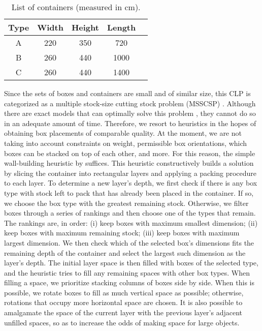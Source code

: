 \documentclass{pssbmac}
\begin{document}
\begin{table}[H]
    \caption{ {\small List of containers (measured in cm).}}
    \centering
    \begin{tabular}{ccccc}
    \hline
    Type & Width & Height & Length\\ \hline
    A  & 220 & 350 & 720\\
    B  & 260 & 440 & 1000\\
    C  & 260 & 440 & 1400\\
    \hline
    \end{tabular}\label{List containers}
\end{table}

Since the sets of boxes and containers are small and of similar size, this CLP is categorized as a multiple stock-size cutting stock problem (MSSCSP) \cite{Bortfeldt2013}. Although there are exact models that can optimally solve this problem \cite{Chen1995}, they cannot do so in an adequate amount of time. Therefore, we resort to heuristics in the hopes of obtaining box placements of comparable quality. At the moment, we are not taking into account constraints on weight, permissible box orientations, which boxes can be stacked on top of each other, and more. For this reason, the simple wall-building heuristic by \textcite{George1980} suffices. This heuristic constructively builds a solution by slicing the container into rectangular layers and applying a packing procedure to each layer. To determine a new layer's depth, we first check if there is any box type with stock left to pack that has already been placed in the container. If so, we choose the box type with the greatest remaining stock. Otherwise, we filter boxes through a series of rankings and then choose one of the types that remain. The rankings are, in order: (i) keep boxes with maximum smallest dimension; (ii) keep boxes with maximum remaining stock; (iii) keep boxes with maximum largest dimension. We then check which of the selected box's dimensions fits the remaining depth of the container and select the largest such dimension as the layer's depth. The initial layer space is then filled with boxes of the selected type, and the heuristic tries to fill any remaining spaces with other box types. When filling a space, we prioritize stacking columns of boxes side by side. When this is possible, we rotate boxes to fill as much vertical space as possible; otherwise, rotations that occupy more horizontal space are chosen. It is also possible to amalgamate the space of the current layer with the previous layer's adjacent unfilled spaces, so as to increase the odds of making space for large objects.
\end{document}
